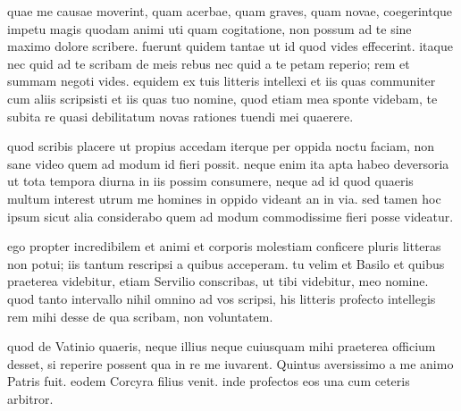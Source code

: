 


 quae me causae moverint, quam acerbae, quam graves, quam novae, coegerintque impetu magis quodam animi uti quam cogitatione, non possum ad te sine maximo dolore scribere. fuerunt quidem tantae ut id quod vides effecerint. itaque nec quid ad te scribam de meis rebus nec quid a te petam reperio; rem et summam negoti vides. equidem ex tuis litteris intellexi et iis quas communiter cum aliis scripsisti et iis quas tuo nomine, quod etiam mea sponte videbam, te subita re quasi debilitatum novas rationes tuendi mei quaerere.

 quod scribis placere ut propius accedam iterque per oppida noctu faciam, non sane video quem ad modum id fieri possit. neque enim ita apta habeo deversoria ut tota tempora diurna in iis possim consumere, neque ad id quod quaeris multum interest utrum me homines in oppido videant an in via. sed tamen hoc ipsum sicut alia considerabo quem ad modum commodissime fieri posse videatur.

 ego propter incredibilem et animi et corporis molestiam conficere pluris litteras non potui; iis tantum rescripsi a quibus acceperam. tu velim et Basilo et quibus praeterea videbitur, etiam Servilio conscribas, ut tibi videbitur, meo nomine. quod tanto intervallo nihil omnino ad vos scripsi, his litteris profecto intellegis rem mihi desse de qua scribam, non voluntatem.

 quod de Vatinio quaeris, neque illius neque cuiusquam mihi praeterea officium desset, si reperire possent qua in re me iuvarent. Quintus aversissimo a me animo Patris fuit. eodem Corcyra filius venit. inde profectos eos una cum ceteris arbitror.
